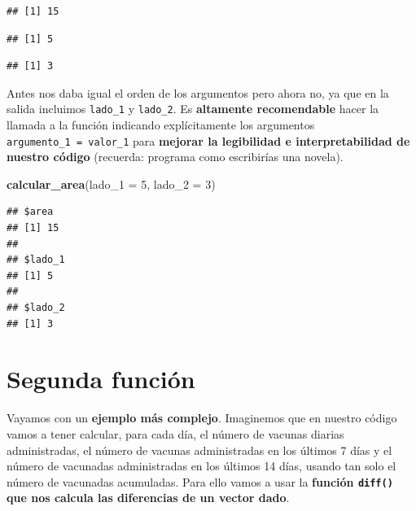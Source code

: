 \documentclass[11pt,]{book}
\newenvironment{Shaded}{\begin{snugshade}}{\end{snugshade}}
\newcommand{\DataTypeTok}[1]{\textcolor[rgb]{0.27,0.27,0.27}{#1}}
\newcommand{\DecValTok}[1]{\textcolor[rgb]{0.06,0.06,0.06}{#1}}
\newcommand{\KeywordTok}[1]{\textcolor[rgb]{0.27,0.27,0.27}{\textbf{#1}}}
\newcommand{\NormalTok}[1]{#1}
\newcommand{\OperatorTok}[1]{\textcolor[rgb]{0.43,0.43,0.43}{\textbf{#1}}}
\begin{document}
\begin{verbatim}
## [1] 15
\end{verbatim}

\begin{Shaded}
\end{Shaded}

\begin{verbatim}
## [1] 5
\end{verbatim}

\begin{Shaded}
\end{Shaded}

\begin{verbatim}
## [1] 3
\end{verbatim}

Antes nos daba igual el orden de los argumentos pero ahora no, ya que en la salida incluimos \texttt{lado\_1} y \texttt{lado\_2}. Es \textbf{altamente recomendable} hacer la llamada a la función indicando explícitamente los argumentos \texttt{argumento\_1\ =\ valor\_1} para \textbf{mejorar la legibilidad e interpretabilidad de nuestro código} (recuerda: programa como escribirías una novela).

\begin{Shaded}
\begin{Highlighting}[]
\KeywordTok{calcular_area}\NormalTok{(}\DataTypeTok{lado_1 =} \DecValTok{5}\NormalTok{, }\DataTypeTok{lado_2 =} \DecValTok{3}\NormalTok{)}
\end{Highlighting}
\end{Shaded}

\begin{verbatim}
## $area
## [1] 15
## 
## $lado_1
## [1] 5
## 
## $lado_2
## [1] 3
\end{verbatim}

\hypertarget{segunda-funciuxf3n}{%
\section{Segunda función}\label{segunda-funciuxf3n}}

Vayamos con un \textbf{ejemplo más complejo}. Imaginemos que en nuestro código vamos a tener calcular, para cada día, el número de vacunas diarias administradas, el número de vacunas administradas en los últimos 7 días y el número de vacunadas administradas en los últimos 14 días, usando tan solo el número de vacunadas acumuladas. Para ello vamos a usar la \textbf{función \texttt{diff()} que nos calcula las diferencias de un vector dado}.
\end{document}
